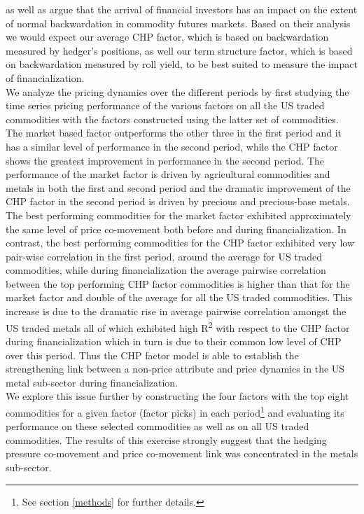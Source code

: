 \documentclass[12pt,]{article}
\let\rmarkdownfootnote\footnote%
\def\footnote{\protect\rmarkdownfootnote}
\begin{document}
\citet{goldstein_commodity_2017} as well as
\citet{goldstein_speculation_2014} argue that the arrival of financial
investors has an impact on the extent of normal backwardation in
commodity futures markets. Based on their analysis we would expect our
average CHP factor, which is based on backwardation measured by hedger's
positions, as well our term structure factor, which is based on
backwardation measured by roll yield, to be best suited to measure the
impact of financialization.\\
We analyze the pricing dynamics over the different periods by first
studying the time series pricing performance of the various factors on
all the US traded commodities with the factors constructed using the
latter set of commodities. The market based factor outperforms the other
three in the first period and it has a similar level of performance in
the second period, while the CHP factor shows the greatest improvement
in performance in the second period. The performance of the market
factor is driven by agricultural commodities and metals in both the
first and second period and the dramatic improvement of the CHP factor
in the second period is driven by precious and precious-base metals. The
best performing commodities for the market factor exhibited
approximately the same level of price co-movement both before and during
financialization. In contrast, the best performing commodities for the
CHP factor exhibited very low pair-wise correlation in the first period,
around the average for US traded commodities, while during
financialization the average pairwise correlation between the top
performing CHP factor commodities is higher than that for the market
factor and double of the average for all the US traded commodities. This
increase is due to the dramatic rise in average pairwise correlation
amongst the US traded metals all of which exhibited high
R\textsuperscript{2} with respect to the CHP factor during
financialization which in turn is due to their common low level of CHP
over this period. Thus the CHP factor model is able to establish the
strengthening link between a non-price attribute and price dynamics in
the US metal sub-sector during financialization.\\
We explore this issue further by constructing the four factors with the
top eight commodities for a given factor (factor picks) in each
period\footnote{See section \ref{methods} for further details.} and
evaluating its performance on these selected commodities as well as on
all US traded commodities. The results of this exercise strongly suggest
that the hedging pressure co-movement and price co-movement link was
concentrated in the metals sub-sector.
\end{document}
